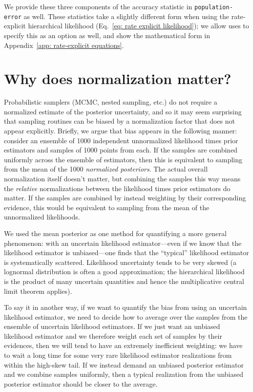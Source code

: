 We provide these three components of the accuracy statistic in \texttt{population-error} as well. These statistics take a slightly different form when using the rate-explicit hierarchical likelihood (Eq.~\ref{eq: rate explicit likelihood}); we allow uses to specify this as an option as well, and show the mathematical form in Appendix~\ref{app: rate-explicit equations}.

\section{Why does normalization matter?}
\label{app: normalization discussion}

Probabilistic samplers (MCMC, nested sampling, etc.) do not require a normalized estimate of the posterior uncertainty, and so it may seem surprising that sampling routines can be biased by a normalization factor that does not appear explicitly. Briefly, we argue that bias appears in the following manner: consider an ensemble of 1000 independent unnormalized likelihood times prior estimators and samples of 1000 points from each. If the samples are combined uniformly across the ensemble of estimators, then this is equivalent to sampling from the mean of the 1000 \textit{normalized posteriors}. The actual overall normalization itself doesn’t matter, but combining the samples this way means the \textit{relative} normalizations between the likelihood times prior estimators do matter. If the samples are combined by instead weighting by their corresponding evidence, this would be equivalent to sampling from the mean of the unnormalized likelihoods. 

We used the mean posterior as one method for quantifying a more general phenomenon: with an uncertain likelihood estimator---even if we know that the likelihood estimator is unbiased---one finds that the ``typical'' likelihood estimator is systematically scattered. Likelihood uncertainty tends to be very skewed (a lognormal distribution is often a good approximation; the hierarchical likelihood is the product of many uncertain quantities and hence the multiplicative central limit theorem applies).
 
To say it in another way, if we want to quantify the bias from using an uncertain likelihood estimator, we need to decide how to average over the samples from the ensemble of uncertain likelihood estimators. If we just want an unbiased likelihood estimator and we therefore weight each set of samples by their evidences, then we will tend to have an extremely inefficient weighting: we have to wait a long time for some very rare likelihood estimator realizations from within the high-skew tail. If we instead demand an unbiased posterior estimator and we combine samples uniformly, then a typical realization from the unbiased posterior estimator should be closer to the average. 

